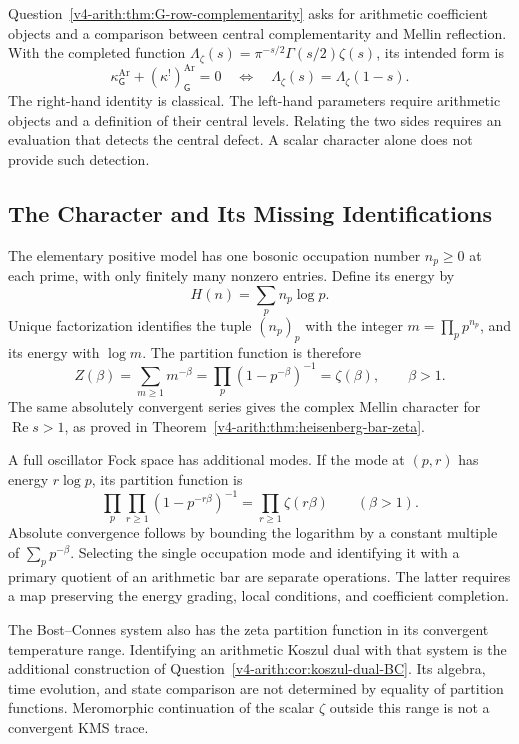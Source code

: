 Question~\ref{v4-arith:thm:G-row-complementarity} asks for arithmetic
coefficient objects and a comparison between central complementarity
and Mellin reflection. With the completed function
\(\Lambda_\zeta(s)=\pi^{-s/2}\Gamma(s/2)\zeta(s)\), its intended form is
\begin{equation}
\label{v4-arith:cl:eq:G-row}
 \kappa^{\mathrm{Ar}}_{\mathsf G}
 +(\kappa^!)^{\mathrm{Ar}}_{\mathsf G}=0
 \quad\Longleftrightarrow\quad
 \Lambda_\zeta(s)=\Lambda_\zeta(1-s).
\end{equation}
The right-hand identity is classical. The left-hand parameters require
arithmetic objects and a definition of their central levels. Relating
the two sides requires an evaluation that detects the central defect.
A scalar character alone does not provide such detection.

\subsection{The Character and Its Missing Identifications}

The elementary positive model has one bosonic occupation number
\(n_p\geq0\) at each prime, with only finitely many nonzero entries.
Define its energy by
\[
 H(n)=\sum_p n_p\log p.
\]
Unique factorization identifies the tuple \((n_p)_p\) with the integer
\(m=\prod_p p^{n_p}\), and its energy with \(\log m\).
The partition function is therefore
\begin{equation}
 Z(\beta)=\sum_{m\geq1}m^{-\beta}
         =\prod_p(1-p^{-\beta})^{-1}=\zeta(\beta),
 \qquad \beta>1.
\end{equation}
The same absolutely convergent series gives the complex Mellin
character for \(\operatorname{Re}s>1\), as proved in
Theorem~\ref{v4-arith:thm:heisenberg-bar-zeta}.

A full oscillator Fock space has additional modes. If the mode at
\((p,r)\) has energy \(r\log p\), its partition function is
\[
 \prod_p\prod_{r\geq1}(1-p^{-r\beta})^{-1}
 =\prod_{r\geq1}\zeta(r\beta)\qquad(\beta>1).
\]
Absolute convergence follows by bounding the logarithm by a constant
multiple of \(\sum_p p^{-\beta}\).
Selecting the single occupation mode and identifying it with a primary
quotient of an arithmetic bar are separate operations. The latter
requires a map preserving the energy grading, local conditions,
and coefficient completion.

The Bost--Connes system also has the zeta partition function in its
convergent temperature range. Identifying an arithmetic Koszul dual
with that system is the additional construction of
Question~\ref{v4-arith:cor:koszul-dual-BC}.
Its algebra, time evolution, and state comparison are not determined
by equality of partition functions. Meromorphic continuation of the
scalar \(\zeta\) outside this range is not a convergent KMS trace.

